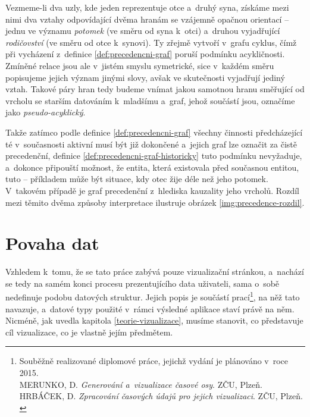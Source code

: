 		Vezmeme-li dva uzly, kde jeden reprezentuje otce a~druhý syna, získáme mezi nimi dva vztahy odpovídající dvěma hranám se vzájemně opačnou orientací -- jednu ve významu \emph{potomek} (ve směru od syna k~otci) a~druhou vyjadřující \emph{rodičovství} (ve směru od otce k~synovi). Ty zřejmě vytvoří v~grafu cyklus, čímž při vycházení z~definice \ref{def:precedencni-graf} poruší podmínku acykličnosti. Zmíněné relace jsou ale v~jistém smyslu symetrické, sice v~každém směru popisujeme jejich význam jinými slovy, avšak ve skutečnosti vyjadřují jediný vztah. Takové páry hran tedy budeme vnímat jakou samotnou hranu směřující od vrcholu se starším datováním k~mladšímu a~graf, jehož součástí jsou, označíme jako \emph{pseudo-acyklický}.
		
		Takže zatímco podle definice \ref{def:precedencni-graf} všechny činnosti předcházející té v~součas\-nosti aktivní musí být již dokončené a~jejich graf lze označit za čistě precedenční, definice \ref{def:precedencni-graf-historicky} tuto podmínku nevyža\-duje, a~dokonce připouští možnost, že entita, která existovala před součas\-nou entitou, tuto  -- příkladem může být situace, kdy otec žije déle než jeho potomek. V~takovém případě je graf precedenční z~hlediska kauzality jeho vrcholů. Rozdíl mezi těmito dvěma způsoby interpretace ilustruje obrázek \ref{img:precedence-rozdil}.

		
	\section{Povaha dat}
	\label{povaha-historickych-dat}
		Vzhledem k~tomu, že se tato práce zabývá pouze vizualizační stránkou, a~nachází se tedy na samém konci procesu prezentujícího data uživateli, sama o~sobě nedefinuje podobu datových struktur. Jejich popis je součástí prací\footnote{Souběžně realizované diplomové práce, jejichž vydání je plánováno v~roce 2015.\\
		MERUNKO, D. \emph{Generování a~vizualizace časové osy}. ZČU, Plzeň.\\
		HRBÁČEK, D. \emph{Zpracování časových údajů pro jejich vizualizaci}. ZČU, Plzeň.\\
		}, na něž tato navazuje, a~datové typy použité v~rámci výsledné aplikace staví právě na něm.
		Nicméně, jak uvedla kapitola \ref{teorie-vizualizace}, musíme stanovit, co představuje cíl vizualizace, co je vlastně jejím předmětem.
		
